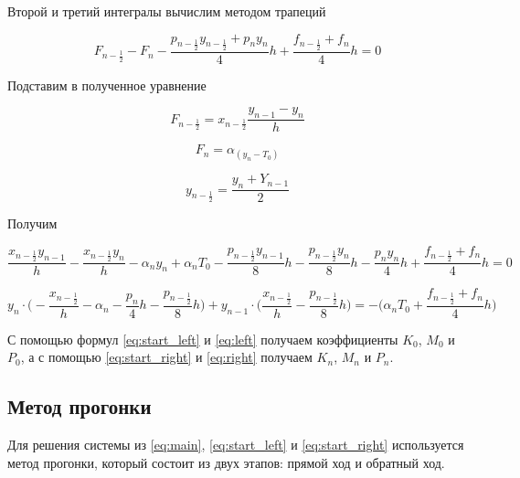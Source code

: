 Второй и третий интегралы вычислим методом трапеций

\begin{equation*}
    F_{n-\frac{1}{2}} - F_n -
    \frac{p_{n-\frac{1}{2}}y_{n-\frac{1}{2}} + p_ny_n}{4} h +
    \frac{f_{n-\frac{1}{2}} + f_n}{4} h = 0
\end{equation*}

Подставим в полученное уравнение

\begin{equation*}
    F_{n-\frac{1}{2}} = x_{n-\frac{1}{2}} \frac{y_{n-1} - y_n}{h}
\end{equation*}

\begin{equation*}
    F_n = \alpha_(y_n-T_0)
\end{equation*}

\begin{equation*}
    y_{n-\frac{1}{2}} = \frac{y_n + Y_{n-1}}{2}
\end{equation*}

Получим

\begin{equation*}
    \frac{x_{n-\frac{1}{2}} y_{n-1}}{h} -
    \frac{x_{n-\frac{1}{2}} y_{n}}{h} -
    \alpha_ny_n +
    \alpha_nT_0 -
    \frac{p_{n-\frac{1}{2}} y_{n-1}}{8}h -
    \frac{p_{n-\frac{1}{2}} y_{n}}{8}h -
    \frac{p_{n}y_{n}}{4}h +
    \frac{f_{n-\frac{1}{2}} + f_n}{4}h = 0
\end{equation*}

\begin{equation}\label{eq:right}
    y_n \cdot \bigg( -\frac{x_{n-\frac{1}{2}}}{h} - \alpha_n -
    \frac{p_n}{4}h - \frac{p_{n-\frac{1}{2}}}{8} h \bigg) +
    y_{n-1} \cdot \bigg( \frac{x_{n-\frac{1}{2}}}{h} -
    \frac{p_{n-\frac{1}{2}}}{8} h \bigg) = - \bigg(
    \alpha_nT_0 + \frac{f_{n-\frac{1}{2}} + f_n}{4} h \bigg)
\end{equation}

С помощью формул \ref{eq:start_left} и \ref{eq:left} получаем коэффициенты
$K_0$, $M_0$ и $P_0$, а с помощью \ref{eq:start_right} и \ref{eq:right} получаем
$K_n$, $M_n$ и $P_n$.

\subsection{Метод прогонки}

Для решения системы из \ref{eq:main}, \ref{eq:start_left} и \ref{eq:start_right}
используется метод прогонки, который состоит из двух этапов: прямой ход и
обратный ход.


